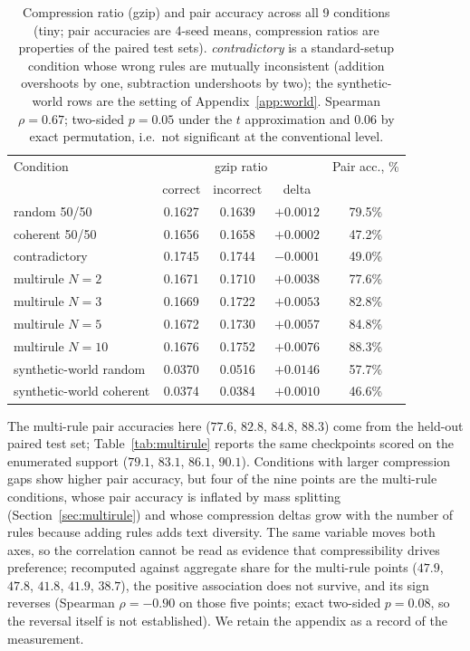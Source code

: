 \documentclass{article}
\begin{document}
\begin{table}[ht]
\centering
\small
\begin{tabular}{lcccc}
\toprule
Condition & \multicolumn{3}{c}{gzip ratio} & Pair acc., \% \\
 & correct & incorrect & delta & \\
\midrule
random 50/50     & 0.1627 & 0.1639 & $+0.0012$ & 79.5\% \\
coherent 50/50   & 0.1656 & 0.1658 & $+0.0002$ & 47.2\% \\
contradictory    & 0.1745 & 0.1744 & $-0.0001$ & 49.0\% \\
multirule $N{=}2$  & 0.1671 & 0.1710 & $+0.0038$ & 77.6\% \\
multirule $N{=}3$  & 0.1669 & 0.1722 & $+0.0053$ & 82.8\% \\
multirule $N{=}5$  & 0.1672 & 0.1730 & $+0.0057$ & 84.8\% \\
multirule $N{=}10$ & 0.1676 & 0.1752 & $+0.0076$ & 88.3\% \\
synthetic-world random   & 0.0370 & 0.0516 & $+0.0146$ & 57.7\% \\
synthetic-world coherent & 0.0374 & 0.0384 & $+0.0010$ & 46.6\% \\
\bottomrule
\end{tabular}
\caption{Compression ratio (gzip) and pair accuracy across all 9 conditions (tiny; pair accuracies are 4-seed means, compression ratios are properties of the paired test sets). \emph{contradictory} is a standard-setup condition whose wrong rules are mutually inconsistent (addition overshoots by one, subtraction undershoots by two); the synthetic-world rows are the setting of Appendix~\ref{app:world}. Spearman $\rho = 0.67$; two-sided $p = 0.05$ under the $t$ approximation and $0.06$ by exact permutation, i.e.\ not significant at the conventional level.}
\label{tab:compression}
\end{table}

The multi-rule pair accuracies here ($77.6$, $82.8$, $84.8$, $88.3$) come from the held-out paired test set; Table~\ref{tab:multirule} reports the same checkpoints scored on the enumerated support ($79.1$, $83.1$, $86.1$, $90.1$). Conditions with larger compression gaps show higher pair accuracy, but four of the nine points are the multi-rule conditions, whose pair accuracy is inflated by mass splitting (Section~\ref{sec:multirule}) and whose compression deltas grow with the number of rules because adding rules adds text diversity. The same variable moves both axes, so the correlation cannot be read as evidence that compressibility drives preference; recomputed against aggregate share for the multi-rule points ($47.9$, $47.8$, $41.8$, $41.9$, $38.7$), the positive association does not survive, and its sign reverses (Spearman $\rho = -0.90$ on those five points; exact two-sided $p = 0.08$, so the reversal itself is not established). We retain the appendix as a record of the measurement.
\end{document}
